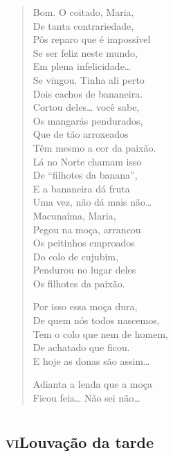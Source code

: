 \begin{verse}
Bom. O coitado, Maria,\\
De tanta contrariedade,\\
Pôs reparo que é impossível\\
Se ser feliz neste mundo,\\
Em plena infelicidade\ldots{}\\
Se vingou. Tinha ali perto\\
Dois cachos de bananeira.\\
Cortou deles\ldots{} você sabe,\\
Os mangarás pendurados,\\
Que de tão arroxeados\\
Têm mesmo a cor da paixão.\\
Lá no Norte chamam isso\\
De ``filhotes da banana'',\\
E a bananeira dá fruta\\
Uma vez, não dá mais não\ldots{}\\
Macunaíma, Maria,\\
Pegou na moça, arrancou\\
Os peitinhos emproados\\
Do colo de cujubim,\\
Pendurou no lugar deles\\
Os filhotes da paixão.

Por isso essa moça dura,\\
De quem nós todos nascemos,\\
Tem o colo que nem de homem,\\
De achatado que ficou.\\
E hoje as donas são assim\ldots{}

Adianta a lenda que a moça\\
Ficou feia\ldots{} Não sei não\ldots{}
\end{verse}

\chapter*{}
\section*{\textsc{vi}\break Louvação da tarde}

